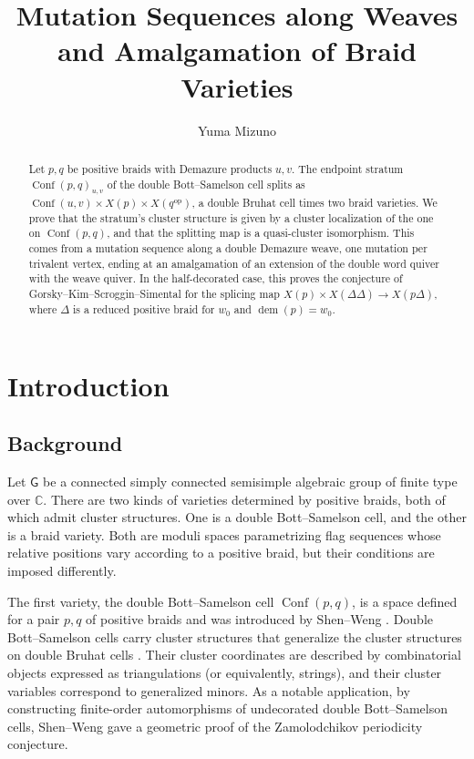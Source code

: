 \documentclass[10pt,a4paper]{article}
\title{Mutation Sequences along Weaves and Amalgamation of Braid Varieties}
\author{Yuma Mizuno}
\date{}
\theoremstyle{definition}
\theoremstyle{remark}
\newcommand{\C}{\mathbb C}
\newcommand{\groupG}{\mathsf{G}}
\newcommand{\Conf}{\operatorname{Conf}}
\begin{document}
\maketitle

\begin{abstract}
Let \(p,q\) be positive braids with Demazure products \(u,v\).  The endpoint
stratum \(\operatorname{Conf}(p,q)_{u,v}\) of the double Bott--Samelson cell
splits as \(\operatorname{Conf}(u,v)\times X(p)\times X(q^{\mathrm{op}})\), a
double Bruhat cell times two braid varieties.  We prove that the stratum's cluster
structure is given by a cluster localization of the one on \(\operatorname{Conf}(p,q)\), 
and that the splitting map is a quasi-cluster isomorphism.  This comes from a
mutation sequence along a double Demazure weave, one mutation per trivalent
vertex, ending at an amalgamation of an extension of the double word quiver 
with the weave quiver.  In the half-decorated case, this proves the conjecture of
Gorsky--Kim--Scroggin--Simental for the splicing map
\(X(p)\times X(\Delta\Delta)\to X(p\Delta)\), where \(\Delta\) is a reduced
positive braid for \(w_0\) and \(\operatorname{dem}(p)=w_0\).
\end{abstract}

\section{Introduction}

\subsection{Background}

Let \(\groupG\) be a connected simply connected semisimple algebraic group of
finite type over \(\C\).  There are two kinds of varieties determined by positive braids,
both of which admit cluster structures.
One is a double Bott--Samelson cell, and the
other is a braid variety.  Both are moduli spaces parametrizing flag sequences
whose relative positions vary according to a positive braid, but their
conditions are imposed differently.

The first variety, the double Bott--Samelson cell \(\Conf(p,q)\), is a space
defined for a pair \(p,q\) of positive braids and was introduced by
Shen--Weng \cite{ShenWeng2021}.  Double Bott--Samelson cells carry cluster
structures that generalize the cluster structures on double Bruhat cells
\cite{BerensteinFominZelevinsky2005}.
Their cluster coordinates are described by combinatorial objects expressed as triangulations 
(or equivalently, strings), and their cluster variables correspond to generalized minors.  
As a notable application, by constructing finite-order automorphisms of undecorated
double Bott--Samelson cells, Shen--Weng gave a geometric proof of the
Zamolodchikov periodicity conjecture.
\end{document}
